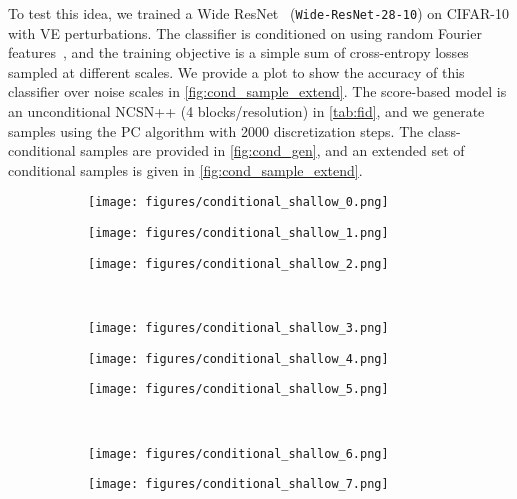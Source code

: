\documentclass{article} \usepackage{iclr2021_conference,times}
\begin{document}
To test this idea, we trained a Wide ResNet~\citep{zagoruyko2016wide} (\verb|Wide-ResNet-28-10|) on CIFAR-10 with VE perturbations. The classifier is conditioned on  using random Fourier features~\citep{tancik2020fourfeat}, and the training objective is a simple sum of cross-entropy losses sampled at different scales. We provide a plot to show the accuracy of this classifier over noise scales in \cref{fig:cond_sample_extend}. The score-based model is an unconditional NCSN++ (4 blocks/resolution) in \cref{tab:fid}, and we generate samples using the PC algorithm with 2000 discretization steps. The class-conditional samples are provided in \cref{fig:cond_gen}, and an extended set of conditional samples is given in \cref{fig:cond_sample_extend}.
\begin{figure}
    \centering
    \begin{subfigure}{0.32\textwidth}
        \texttt{[image: figures/conditional\_shallow\_0.png]}
    \end{subfigure}
    \begin{subfigure}{0.32\textwidth}
        \texttt{[image: figures/conditional\_shallow\_1.png]}
    \end{subfigure}
    \begin{subfigure}{0.32\textwidth}
        \texttt{[image: figures/conditional\_shallow\_2.png]}
    \end{subfigure}\\
    \begin{subfigure}{0.32\textwidth}
        \texttt{[image: figures/conditional\_shallow\_3.png]}
    \end{subfigure}
    \begin{subfigure}{0.32\textwidth}
        \texttt{[image: figures/conditional\_shallow\_4.png]}
    \end{subfigure}
    \begin{subfigure}{0.32\textwidth}
        \texttt{[image: figures/conditional\_shallow\_5.png]}
    \end{subfigure}\\
    \begin{subfigure}{0.32\textwidth}
        \texttt{[image: figures/conditional\_shallow\_6.png]}
    \end{subfigure}
    \begin{subfigure}{0.32\textwidth}
        \texttt{[image: figures/conditional\_shallow\_7.png]}
    \end{subfigure}

\end{figure}
\end{document}
